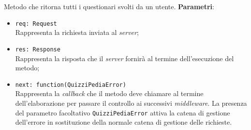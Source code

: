 \begin{itemize}
\begin{itemize}
		Metodo che ritorna tutti i questionari svolti da un utente.
		\textbf{Parametri}:
		\begin{itemize}
			\item \texttt{req: Request}\\
			Rappresenta la richiesta inviata al \textit{server};
			\item \texttt{res: Response}\\
			Rappresenta la risposta che il \textit{server} fornirà al termine dell'esecuzione del metodo;
			\item \texttt{next: function(QuizziPediaError)}\\
			Rappresenta la \textit{callback} che il metodo deve chiamare al termine dell'elaborazione per passare il controllo ai successivi \textit{middleware}. La presenza del parametro facoltativo \texttt{QuizziPediaError} attiva la catena di gestione dell'errore in sostituzione della normale catena di gestione delle richieste.
		\end{itemize}
	\end{itemize}
\end{itemize}